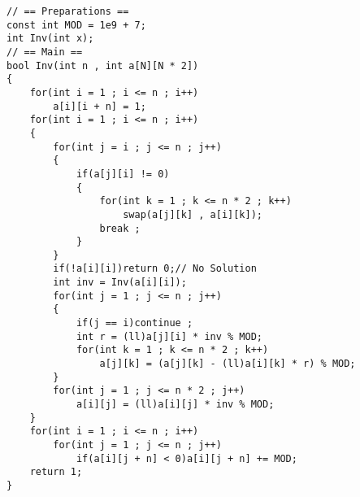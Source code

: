 \begin{verbatim}
// == Preparations ==
const int MOD = 1e9 + 7;
int Inv(int x);
// == Main ==
bool Inv(int n , int a[N][N * 2])
{
    for(int i = 1 ; i <= n ; i++)
        a[i][i + n] = 1;
    for(int i = 1 ; i <= n ; i++)
    {
        for(int j = i ; j <= n ; j++)
        {
            if(a[j][i] != 0)
            {
                for(int k = 1 ; k <= n * 2 ; k++)
                    swap(a[j][k] , a[i][k]);
                break ;
            }
        }
        if(!a[i][i])return 0;// No Solution
        int inv = Inv(a[i][i]);
        for(int j = 1 ; j <= n ; j++)
        {
            if(j == i)continue ;
            int r = (ll)a[j][i] * inv % MOD;
            for(int k = 1 ; k <= n * 2 ; k++)
                a[j][k] = (a[j][k] - (ll)a[i][k] * r) % MOD;
        }
        for(int j = 1 ; j <= n * 2 ; j++)
            a[i][j] = (ll)a[i][j] * inv % MOD;
    }
    for(int i = 1 ; i <= n ; i++)
        for(int j = 1 ; j <= n ; j++)
            if(a[i][j + n] < 0)a[i][j + n] += MOD;
    return 1;
}
\end{verbatim}